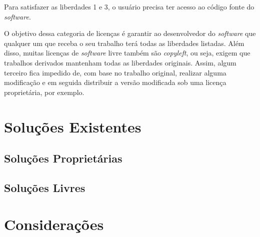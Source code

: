 Para satisfazer as liberdades 1 e 3, o usuário precisa ter acesso ao código fonte do \emph{software}.

O objetivo dessa categoria de licenças é garantir ao desenvolvedor do \emph{software} que qualquer um que receba o seu trabalho terá todas as liberdades listadas. Além disso, muitas licenças de \emph{software} livre também são \emph{copyleft}, ou seja, exigem que trabalhos derivados mantenham todas as liberdades originais. Assim, algum terceiro fica impedido de, com base no trabalho original, realizar alguma modificação e em seguida distribuir a versão modificada sob uma licença proprietária, por exemplo.


\section{Soluções Existentes}

\subsection{Soluções Proprietárias}

\subsection{Soluções Livres}

\section{Considerações}


